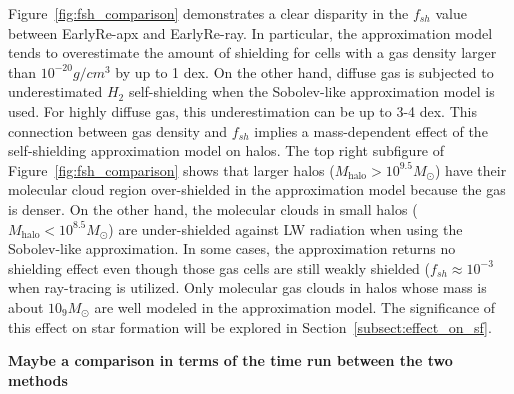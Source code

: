 \documentclass[linenumbers, twocolumn]{aastex631}
\begin{document}
Figure~\ref{fig:fsh_comparison} demonstrates a clear disparity in the $f_{sh}$ value between EarlyRe-apx and EarlyRe-ray. In particular, the approximation model tends to overestimate the amount of shielding for cells with a gas density larger than $10^{-20} g/cm^3$ by up to 1 dex. On the other hand, diffuse gas is subjected to underestimated $H_{2}$ self-shielding when the Sobolev-like approximation model is used. For highly diffuse gas, this underestimation can be up to 3-4 dex. This connection between gas density and $f_{sh}$ implies a mass-dependent effect of the self-shielding approximation model on halos. The top right subfigure of Figure~\ref{fig:fsh_comparison} shows that larger halos ($M_{\text{halo}} > 10^{9.5} M_{\odot}$) have their molecular cloud region over-shielded in the approximation model because the gas is denser. On the other hand, the molecular clouds in small halos ($M_{\text{halo}} < 10^{8.5} M_{\odot}$) are under-shielded against LW radiation when using the Sobolev-like approximation. In some cases, the approximation returns no shielding effect even though those gas cells are still weakly shielded ($f_{sh} \approx 10^{-3}$ when ray-tracing is utilized. Only molecular gas clouds in halos whose mass is about $10_{9} M_\odot$ are well modeled in the approximation model. The significance of this effect on star formation will be explored in Section~\ref{subsect:effect_on_sf}.

\textbf{Maybe a comparison in terms of the time run between the two methods}
\end{document}
